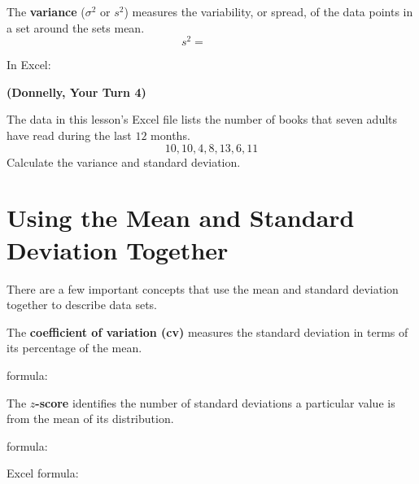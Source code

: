 \documentclass[12pt, letterpaper]{article}
\newcounter{exercise}
\theoremstyle{definition}
\begin{document}
\vfill
\vfill


\begin{defn}
The \textbf{variance} ($\sigma^2$ or $s^2$) measures the variability, or spread, of the data points in a set around the sets mean.
$$ s^2 = ~~~~~~~~~~~~~~ $$
\vspace*{.3in}
\begin{center}
In Excel: $~~~~~~~~~~~~~~$
\end{center}
\end{defn}


\begin{exercise} \textbf{(Donnelly, Your Turn 4)}

The data in this lesson's Excel file lists the number of books that seven adults have read during the last $12$ months.  
$$ 10,10,4,8,13,6,11 $$
Calculate the variance and standard deviation.

\end{exercise}

\vfill

\newpage

\section*{Using the Mean and Standard Deviation Together}

There are a few important concepts that use the mean and standard deviation together to describe data sets.


\begin{defn}
The \textbf{coefficient of variation (cv)} measures the standard deviation in terms of its percentage of the mean.
\begin{center}
formula:  ~~~~~~~~~~~~~~~~~~~~~~~~~~~~~~~~~~~~~~~~~~~
\end{center}
\vspace*{.2in}
\end{defn}

\begin{defn}
The \textbf{$z$-score} identifies the number of standard deviations a particular value is from the mean of its distribution.
\begin{center}
formula:  ~~~~~~~~~~~~~~~~~~~~~~~~~~~~~~~~~~~~~~~~~~~

\vspace*{.2in}

Excel formula:  ~~~~~~~~~~~~~~~~~~~~~~~~~~~~~~~~~~~~~~~~~~~
\end{center}
\vspace*{.2in}
\end{defn}
\end{document}
